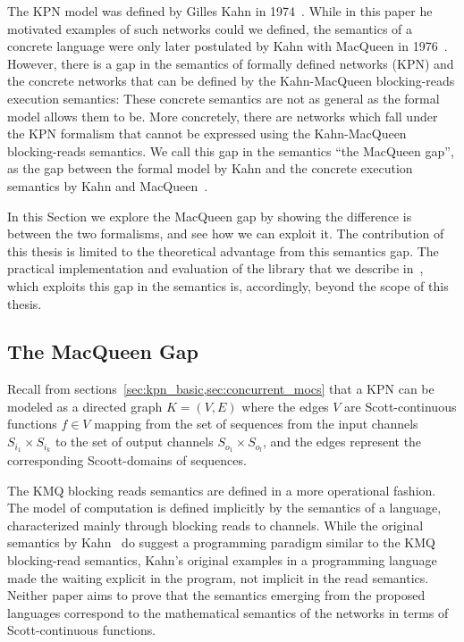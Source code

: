 The \ac{KPN} model was defined by Gilles Kahn in 1974~\cite{kahn74}.
While in this paper he motivated examples of such networks could we defined, the
semantics of a concrete language were only later postulated by Kahn with MacQueen
in 1976~\cite{kahn_macqueen}.
However, there is a gap in the semantics of formally defined networks (\ac{KPN})
and the concrete networks that can be defined by the Kahn-MacQueen
blocking-reads execution semantics: These concrete semantics are not as general
as the formal model allows them to be.
More concretely, there are networks which fall under the \ac{KPN} formalism
that cannot be expressed using the Kahn-MacQueen blocking-reads semantics.
We call this gap in the semantics ``the MacQueen gap'', as the gap between the formal model by Kahn and the concrete execution semantics by Kahn and MacQueen~\cite{lee_matsikoudis_semantics,khasanov_parmaditam18}. 

In this Section we explore the MacQueen gap by showing the difference is between the two formalisms, and see how we can exploit it.
The contribution of this thesis is limited to the theoretical advantage from this semantics gap.
The practical implementation and evaluation of the library that we describe in~\cite{khasanov_parmaditam18}, which exploits this gap in the semantics is, accordingly, beyond the scope of this thesis. 

\subsection{The MacQueen Gap}

Recall from sections~\ref{sec:kpn_basic,sec:concurrent_mocs} that a \ac{KPN} can be modeled as a directed graph $K = (V,E)$ where the edges $V$ are Scott-continuous functions $f \in V$ mapping from the set of sequences from the input channels $S_{i_1} \times S_{i_k}$ to the set of output channels $S_{o_1} \times S_{o_l}$, and the edges represent the corresponding Scoott-domains of sequences.

The \acf{KMQ} blocking reads semantics are defined in a more operational fashion.
The model of computation is defined implicitly by the semantics of a language\cite{kahn_macqueen}, characterized mainly through blocking reads to channels.
While the original semantics by Kahn~\cite{kahn74} do suggest a programming paradigm similar to the \ac{KMQ} blocking-read semantics, Kahn's original examples in a programming language made the waiting explicit in the program, not implicit in the read semantics.
Neither paper aims to prove that the semantics emerging from the proposed languages correspond to the mathematical semantics of the networks in terms of Scott-continuous functions.

